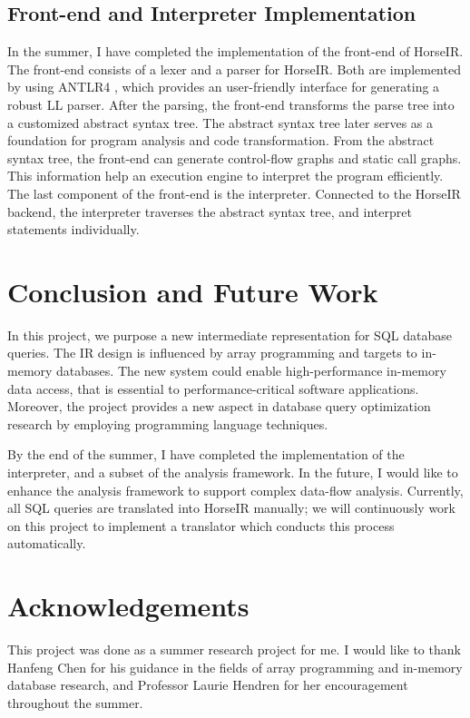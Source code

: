 \documentclass[sigplan]{acmart}
\begin{document}
\subsection*{Front-end and Interpreter Implementation}
In the summer, I have completed the implementation of the front-end of HorseIR.
The front-end consists of a lexer and a parser for HorseIR. Both are
implemented by using ANTLR4\cite{ANTLRHome} , which provides an
user-friendly interface for generating a robust LL parser. After the parsing, the
front-end transforms the parse tree into a customized abstract syntax tree.
The abstract syntax tree later serves as a foundation for program analysis and
code transformation. From the abstract syntax tree, the front-end can generate
control-flow graphs and static call graphs. This information help an
execution engine to interpret the program efficiently.
The last component of the front-end is the interpreter. Connected to the
HorseIR backend, the interpreter traverses the abstract syntax tree, and
interpret statements individually.

\section{Conclusion and Future Work}

In this project, we purpose a new intermediate representation for SQL database
queries. The IR design is influenced by array programming and targets to
in-memory databases. The new system could enable high-performance in-memory
data access, that is essential to performance-critical software applications.
Moreover, the project provides a new aspect in database query optimization
research by employing programming language techniques. 

By the end of the summer, I have completed the implementation of the
interpreter, and a subset of the analysis framework. In the future, I would
like to enhance the analysis framework to support complex data-flow
analysis. Currently, all SQL queries are translated into HorseIR manually; we
will continuously work on this project to implement a translator
which conducts this process automatically.

\section*{Acknowledgements}
This project was done as a summer research project for me. I would like to
thank Hanfeng Chen for his guidance in the fields of array programming and
in-memory database research, and Professor Laurie Hendren for her encouragement
throughout the summer. 



\end{document}
